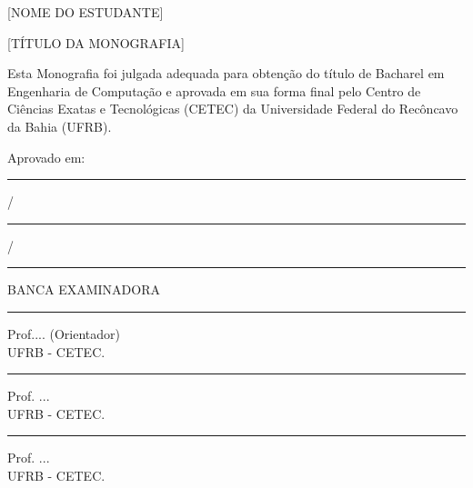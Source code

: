 
\begin{titlepage}
    \begin{center}
		
		\vspace{0.5cm}		
		[NOME DO ESTUDANTE]
		\vspace{0.5cm}
	\end{center}

		
	\begin{center}		
		\vspace{1cm}
		{\large {[TÍTULO DA MONOGRAFIA]\\}}
		
		\vspace{3cm}
	\end{center}
	
	\begin{flushright}
	\begin{minipage}[l]{8cm}
	Esta Monografia foi julgada adequada para obtenção do título de Bacharel em Engenharia de Computação e aprovada em sua forma final pelo Centro de Ciências Exatas e Tecnológicas (CETEC) da Universidade Federal do Recôncavo da Bahia (UFRB).
	
		\end{minipage}
\end{flushright}
			\vspace{3cm}

	Aprovado em: \rule{1.5cm}{0.1mm} / \rule{1.5cm}{0.1mm} / \rule{1.5cm}{0.1mm}
	
	\vspace{1.5cm}
	\begin{center}
	 	BANCA EXAMINADORA
	\end{center}
		
	\vspace{0.7cm}
	\begin{center}
		
		\rule{11cm}{0.1mm}
		
		Prof.... (Orientador)\\
		UFRB - CETEC.
		
		
		\vspace{0.8cm}
		
		\rule{11cm}{0.1mm}
		
		Prof. ...\\
		UFRB - CETEC.
		
		
		\vspace{0.8cm}
		\rule{11cm}{0.1mm}
		
		Prof. ...\\
		UFRB - CETEC.

		\vspace{3cm}
		

		

		
	\end{center}
	 \vfill
	 \centering
		
\end{titlepage}

